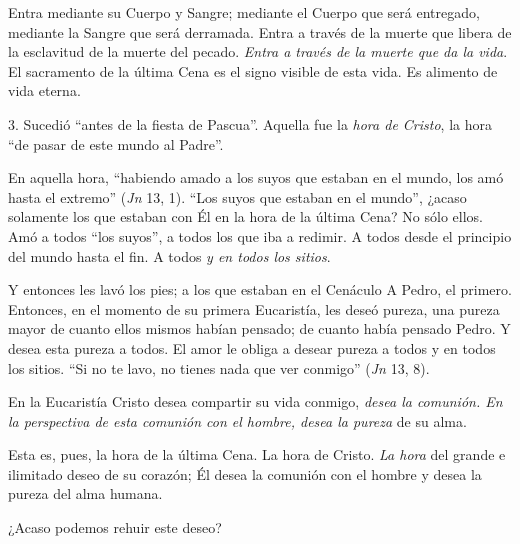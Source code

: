 			\begin{body}Entra mediante su Cuerpo y Sangre; mediante el Cuerpo que será entregado, mediante la Sangre que será derramada. Entra a través de la muerte que libera de la esclavitud de la muerte del pecado. \textit{Entra a través de la muerte que da la vida}. El sacramento de la última Cena es el signo visible de esta vida. Es alimento de vida eterna. \end{body}
			
			\begin{body}3. Sucedió “antes de la fiesta de Pascua”. Aquella fue la \textit{hora de Cristo}, la hora “de pasar de este mundo al Padre”. \end{body}
			
			\begin{body}En aquella hora, “habiendo amado a los suyos que estaban en el mundo, los amó hasta el extremo” (\textit{Jn} 13, 1). “Los suyos que estaban en el mundo”, ¿acaso solamente los que estaban con Él en la hora de la última Cena? No sólo ellos. Amó a todos “los suyos”, a todos los que iba a redimir. A todos desde el principio del mundo hasta el fin. A todos \textit{y en todos los sitios}. \end{body}
			
			\begin{body}Y entonces les lavó los pies; a los que estaban en el Cenáculo A Pedro, el primero. Entonces, en el momento de su primera Eucaristía, les deseó pureza, una pureza mayor de cuanto ellos mismos habían pensado; de cuanto había pensado Pedro. Y desea esta pureza a todos. El amor le obliga a desear pureza a todos y en todos los sitios. “Si no te lavo, no tienes nada que ver conmigo” (\textit{Jn} 13, 8). \end{body}
			
			\begin{body}En la Eucaristía Cristo desea compartir su vida conmigo, \textit{desea la comunión. En la perspectiva de esta comunión con el hombre, desea la pureza} de su alma.\end{body}
			
			\begin{body}Esta es, pues, la hora de la última Cena. La hora de Cristo. \textit{La hora} del grande e ilimitado deseo de su corazón; Él desea la comunión con el hombre y desea la pureza del alma humana. \end{body}
			
			\begin{body}¿Acaso podemos rehuir este deseo?\end{body}
			
